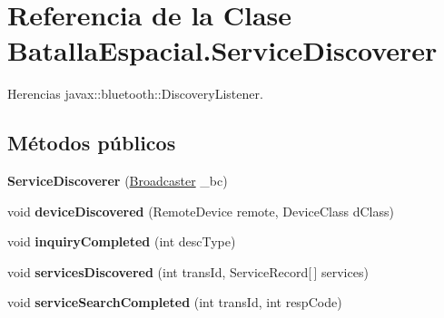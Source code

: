 \hypertarget{classBatallaEspacial_1_1ServiceDiscoverer}{
\section{Referencia de la Clase BatallaEspacial.ServiceDiscoverer}
\label{classBatallaEspacial_1_1ServiceDiscoverer}
}


Herencias javax::bluetooth::DiscoveryListener.

\subsection*{Métodos públicos}
\begin{DoxyCompactItemize}
\item 
\hypertarget{classBatallaEspacial_1_1ServiceDiscoverer_a95046c1506d8ce9e3369fefa39b79715}{
{\bfseries ServiceDiscoverer} (\hyperlink{classBatallaEspacial_1_1Broadcaster}{Broadcaster} \_\-bc)}
\label{classBatallaEspacial_1_1ServiceDiscoverer_a95046c1506d8ce9e3369fefa39b79715}

\item 
\hypertarget{classBatallaEspacial_1_1ServiceDiscoverer_a33ff8fd3dcfb60023edfacdefbdf85c9}{
void {\bfseries deviceDiscovered} (RemoteDevice remote, DeviceClass dClass)}
\label{classBatallaEspacial_1_1ServiceDiscoverer_a33ff8fd3dcfb60023edfacdefbdf85c9}

\item 
\hypertarget{classBatallaEspacial_1_1ServiceDiscoverer_a22214f40f4fed08e8d61e6c0c4cbf03e}{
void {\bfseries inquiryCompleted} (int descType)}
\label{classBatallaEspacial_1_1ServiceDiscoverer_a22214f40f4fed08e8d61e6c0c4cbf03e}

\item 
\hypertarget{classBatallaEspacial_1_1ServiceDiscoverer_a8ae6cdebc17cf67f1c291840df48d568}{
void {\bfseries servicesDiscovered} (int transId, ServiceRecord\mbox{[}$\,$\mbox{]} services)}
\label{classBatallaEspacial_1_1ServiceDiscoverer_a8ae6cdebc17cf67f1c291840df48d568}

\item 
\hypertarget{classBatallaEspacial_1_1ServiceDiscoverer_aa95e2c4baf4ab791dbf01e1a35c18ea8}{
void {\bfseries serviceSearchCompleted} (int transId, int respCode)}
\label{classBatallaEspacial_1_1ServiceDiscoverer_aa95e2c4baf4ab791dbf01e1a35c18ea8}

\end{DoxyCompactItemize}
